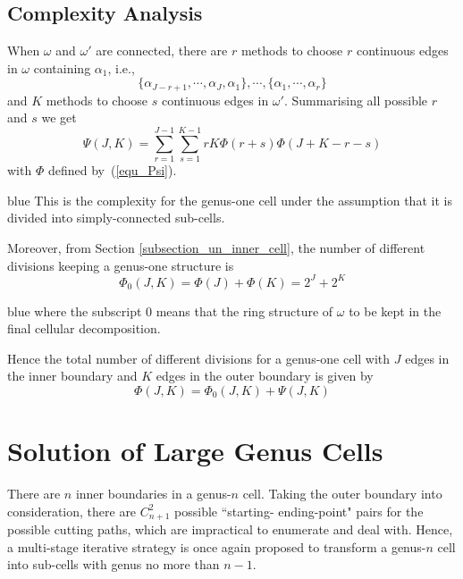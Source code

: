 \documentclass[Afour,sageh,times]{sagej}
\begin{document}
\subsection{Complexity Analysis}\label{subsection_genus_one_complexity}
When $\omega$ and $\omega'$ are connected, there are $r$ methods to choose $r$ continuous edges in $\omega$ containing $\alpha_1$, i.e., 
\begin{equation}
\{\alpha_{J-r+1}, \cdots, \alpha_J, \alpha_1\}, \cdots, \{\alpha_1, \cdots, \alpha_r\}
\end{equation}
and $K$ methods to choose $s$ continuous edges in $\omega'$. Summarising all possible $r$ and $s$ we get
\begin{equation}\label{equ_Psi_1}
\Psi(J, K) = \sum\limits_{r = 1}^{J-1}\sum\limits_{s = 1}^{K-1} rK\Phi(r+s)\Phi(J+K -r-s)
\end{equation}
with $\Phi$ defined by~(\ref{equ_Psi}). 
\begin{color}{blue}
This is the complexity for the genus-one cell under the assumption that it is divided into simply-connected sub-cells. 
\end{color}
Moreover, from Section \ref{subsection_un_inner_cell}, the number of different divisions keeping a genus-one structure is 
\begin{equation}\label{equ_Phi_0}
\Phi_0(J, K) = \Phi(J) + \Phi(K) = 2^J + 2^K
\end{equation}
\begin{color}{blue}
where the subscript $0$ means that the ring structure of $\omega$ to be kept in the final cellular decomposition. 
\end{color}
Hence the total number of different divisions for a genus-one cell with $J$ edges in the inner boundary and $K$ edges in the outer boundary is given by
\begin{equation}
\Phi(J, K) = \Phi_0(J, K) + \Psi(J, K)
\end{equation}

\section{Solution of Large Genus Cells}
\label{section_large_genus}
There are $n$ inner boundaries in a genus-$n$ cell. Taking the outer boundary into consideration, there are $C_{n+1}^2$ 
possible ``starting-  ending-point" pairs for the possible cutting paths, which are impractical to enumerate and deal with. 
Hence, a multi-stage iterative strategy is once again proposed to transform a genus-$n$ cell into sub-cells with genus no more than $n-1$. 
\end{document}
